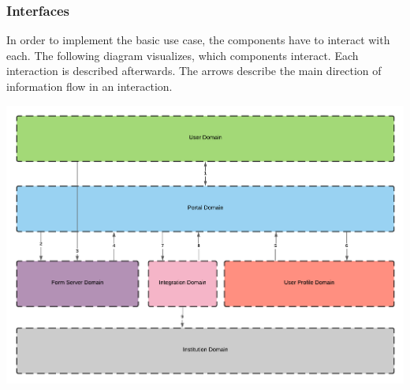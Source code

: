 \subsubsection{Interfaces}
In order to implement the basic use case, the components have to interact with each. The following diagram visualizes, which components interact. Each interaction is described afterwards. The arrows describe the main direction of information flow in an interaction.

\begin{center}
    \includegraphics[scale=0.6]{Diagrams/Interaction Diagram.pdf}
\end{center}

